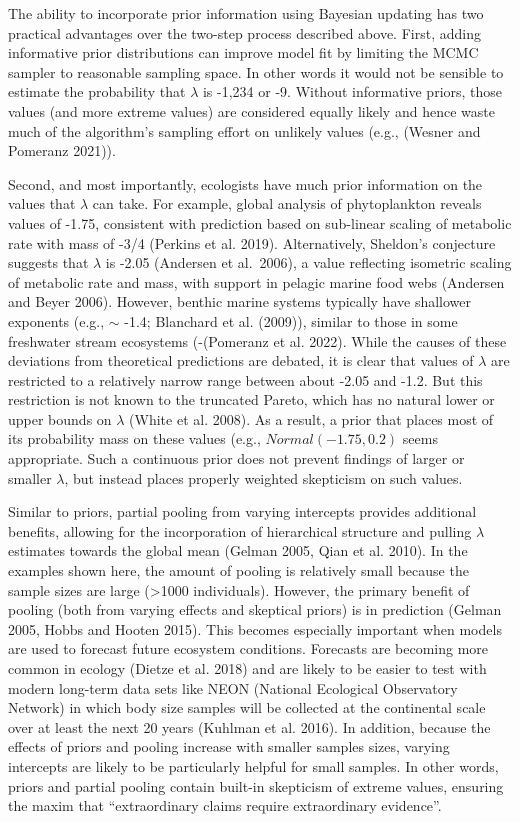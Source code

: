 \documentclass[
  12pt,
]{article}
\begin{document}
The ability to incorporate prior information using Bayesian updating has
two practical advantages over the two-step process described above.
First, adding informative prior distributions can improve model fit by
limiting the MCMC sampler to reasonable sampling space. In other words
it would not be sensible to estimate the probability that \(\lambda\) is
-1,234 or -9. Without informative priors, those values (and more extreme
values) are considered equally likely and hence waste much of the
algorithm's sampling effort on unlikely values (e.g., (Wesner and
Pomeranz 2021)).

Second, and most importantly, ecologists have much prior information on
the values that \(\lambda\) can take. For example, global analysis of
phytoplankton reveals values of -1.75, consistent with prediction based
on sub-linear scaling of metabolic rate with mass of -3/4 (Perkins et
al. 2019). Alternatively, Sheldon's conjecture suggests that \(\lambda\)
is -2.05 (Andersen et al.~2006), a value reflecting isometric scaling of
metabolic rate and mass, with support in pelagic marine food webs
(Andersen and Beyer 2006). However, benthic marine systems typically
have shallower exponents (e.g., \(\sim\) -1.4; Blanchard et al. (2009)),
similar to those in some freshwater stream ecosystems (-(Pomeranz et al.
2022). While the causes of these deviations from theoretical predictions
are debated, it is clear that values of \(\lambda\) are restricted to a
relatively narrow range between about -2.05 and -1.2. But this
restriction is not known to the truncated Pareto, which has no natural
lower or upper bounds on \(\lambda\) (White et al. 2008). As a result, a
prior that places most of its probability mass on these values (e.g.,
\(Normal(-1.75, 0.2)\) seems appropriate. Such a continuous prior does
not prevent findings of larger or smaller \(\lambda\), but instead
places properly weighted skepticism on such values.

Similar to priors, partial pooling from varying intercepts provides
additional benefits, allowing for the incorporation of hierarchical
structure and pulling \(\lambda\) estimates towards the global mean
(Gelman 2005, Qian et al. 2010). In the examples shown here, the amount
of pooling is relatively small because the sample sizes are large
(\textgreater1000 individuals). However, the primary benefit of pooling
(both from varying effects and skeptical priors) is in prediction
(Gelman 2005, Hobbs and Hooten 2015). This becomes especially important
when models are used to forecast future ecosystem conditions. Forecasts
are becoming more common in ecology (Dietze et al. 2018) and are likely
to be easier to test with modern long-term data sets like NEON (National
Ecological Observatory Network) in which body size samples will be
collected at the continental scale over at least the next 20 years
(Kuhlman et al. 2016). In addition, because the effects of priors and
pooling increase with smaller samples sizes, varying intercepts are
likely to be particularly helpful for small samples. In other words,
priors and partial pooling contain built-in skepticism of extreme
values, ensuring the maxim that ``extraordinary claims require
extraordinary evidence''.
\end{document}
